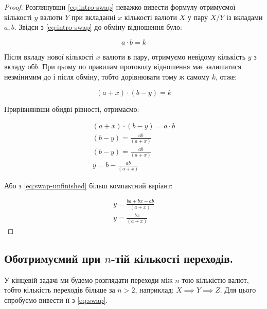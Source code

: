 \documentclass[a4paper, 12pt]{article}
\newcommand{\tqs}{\textquotesingle}
\begin{document}
\begin{proof}
  	Розглянувши \eqref{eq:intro-swap} неважко вивести формулу
	отримуємої кількості \(y\) валюти \(Y\) при вкладанні \(x\) кількості валюти
	\(X\) у пару \(X/Y\) із вкладами \(a, b\). Звідси з \eqref{eq:intro-swap} до
	обміну відношення було:

	\begin{equation*}
		a \cdot b = k
	\end{equation*}

	Після вкладу нової кількості \(x\) валюти в пару, отримуємо невідому кількість
	\(y\) з вкладу об \(b\). При цьому по правилам протоколу відношення має
	залишатися незмінимим до і після обміну, тобто дорівнювати тому ж самому \(k\),
	отже:

	\begin{equation*}
		(a + x) \cdot (b - y) = k
	\end{equation*}

	Прирівнянвши обидві рівності, отримаємо:

	\begin{equation}\label{eq:swap-unfinished}
		\begin{aligned}
			(a + x) \cdot (b - y) = a \cdot b \\
			(b - y) = \frac{a b}{(a + x)}     \\
			(b - y) = \frac{a b}{(a + x)}     \\
			y = b - \frac{a b}{(a + x)}
		\end{aligned}
	\end{equation}

	Або з \eqref{eq:swap-unfinished} більш компактний варіант:

	\begin{equation}
		\begin{aligned}
			y = \frac{ba + bx -  a b}{(a + x)} \\
			y = \frac{bx}{(a + x)}
		\end{aligned}
	\end{equation}
\end{proof}

\subsection{Об отримуємий при \(n\)-тій кількості переходів.}

У кінцевій задачі ми будемо розглядати переходи між \(n\)-тою кількістю валют,
тобто кількість переходів більше за \(n > 2\), наприклад: \(X \implies Y
\implies Z\). Для цього спробуємо вивести її з \eqref{eq:swap}.
\end{document}
